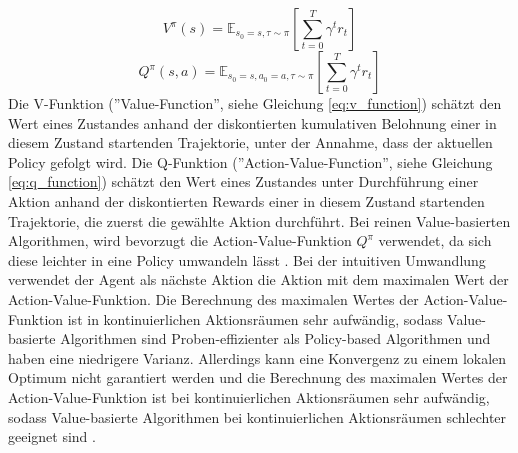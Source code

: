 \begin{equation}
    V^\pi (s)=\mathbb{E}_{s_0=s, \tau \sim \pi} \left[ \sum_{t=0}^T \gamma^t r_t \right]
    \label{eq:v_function}
\end{equation}
\begin{equation}
    Q^\pi (s,a) = \mathbb{E}_{s_0=s,a_0=a,\tau\sim\pi} \left[ \sum_{t=0}^T \gamma^t r_t\right]
    \label{eq:q_function}
\end{equation}
Die V-Funktion (''Value-Function'', siehe Gleichung \ref{eq:v_function}) schätzt den Wert eines Zustandes anhand der diskontierten kumulativen Belohnung einer in diesem Zustand startenden Trajektorie, unter der Annahme, dass der aktuellen Policy gefolgt wird. 
Die Q-Funktion (''Action-Value-Function'', siehe Gleichung \ref{eq:q_function}) schätzt den Wert eines Zustandes unter Durchführung einer Aktion anhand der diskontierten Rewards einer in diesem Zustand startenden Trajektorie, die zuerst die gewählte Aktion durchführt. 
Bei reinen Value-basierten Algorithmen, wird bevorzugt die Action-Value-Funktion $Q^\pi$ verwendet, da sich diese leichter in eine Policy umwandeln lässt \cite{FoundationsDeepRL}. Bei der intuitiven Umwandlung verwendet der Agent als nächste Aktion die Aktion mit dem maximalen Wert der Action-Value-Funktion. Die Berechnung des maximalen Wertes der Action-Value-Funktion ist in kontinuierlichen Aktionsräumen sehr aufwändig, sodass 
Value-basierte Algorithmen sind Proben-effizienter als Policy-based Algorithmen und haben eine niedrigere Varianz. Allerdings kann eine Konvergenz zu einem lokalen Optimum nicht garantiert werden und die Berechnung des maximalen Wertes der Action-Value-Funktion ist bei kontinuierlichen Aktionsräumen sehr aufwändig, sodass Value-basierte Algorithmen bei kontinuierlichen Aktionsräumen schlechter geeignet sind \cite{grokking}.

